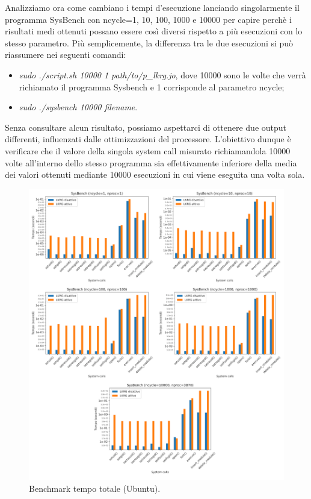 Analizziamo ora come cambiano i tempi d'esecuzione lanciando singolarmente il programma SysBench con ncycle=1, 10, 100, 1000 e 10000 per capire perchè i risultati medi ottenuti possano essere così diversi rispetto a più esecuzioni con lo stesso parametro. Più semplicemente, la differenza tra le due esecuzioni si può riassumere nei seguenti comandi:

\begin{itemize}
\item \emph{sudo ./script.sh 10000 1 path/to/p\_lkrg.jo}, dove 10000 sono le volte che verrà richiamato il programma Sysbench e 1 corrisponde al parametro ncycle;
\item \emph{sudo ./sysbench 10000 filename}.
\end{itemize} 

Senza consultare alcun risultato, possiamo aspettarci di ottenere due output differenti, influenzati dalle ottimizzazioni del processore. L'obiettivo dunque è verificare che il valore della singola system call misurato richiamandola 10000 volte all'interno dello stesso programma sia effettivamente inferiore della media dei valori ottenuti mediante 10000 esecuzioni in cui viene eseguita una volta sola.

\begin{figure}[!ht]
\centering
\includegraphics[scale=1.4]{Figures/Ubuntu/Total}
\caption[Benchmark tempo totale (Ubuntu)]{Benchmark tempo totale (Ubuntu).}
\label{fig:totUbuntuFig}
\end{figure}

